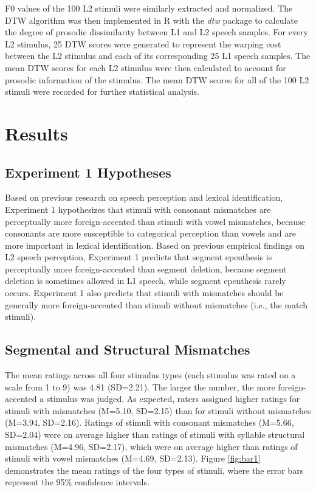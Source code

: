 F0 values of the 100 L2 stimuli were similarly extracted and normalized. The DTW algorithm was then implemented in R with the \textit{dtw} package \citep{Giorgino_2009} to calculate the degree of prosodic dissimilarity between L1 and L2 speech samples. For every L2 stimulus, 25 DTW scores were generated to represent the warping cost between the L2 stimulus and each of its corresponding 25 L1 speech samples. The mean DTW scores for each L2 stimulus were then calculated to account for prosodic information of the stimulus. The mean DTW scores for all of the 100 L2 stimuli were recorded for further statistical analysis. 

\section{Results}
\subsection{Experiment 1 Hypotheses}
Based on previous research on speech perception and lexical identification, Experiment 1 hypothesizes that stimuli with consonant mismatches are perceptually more foreign-accented than stimuli with vowel mismatches, because consonants are more susceptible to categorical perception than vowels and are more important in lexical identification. Based on previous empirical findings on L2 speech perception, Experiment 1 predicts that segment epenthesis is perceptually more foreign-accented than segment deletion, because segment deletion is sometimes allowed in L1 speech, while segment epenthesis rarely occurs. Experiment 1 also predicts that stimuli with mismatches should be generally more foreign-accented than stimuli without mismatches (i.e., the match stimuli).

\subsection{Segmental and Structural Mismatches}

The mean ratings across all four stimulus types (each stimulus was rated on a scale from 1 to 9) was 4.81 (SD=2.21). The larger the number, the more foreign-accented a stimulus was judged. As expected, raters assigned higher ratings for stimuli with mismatches (M=5.10, SD=2.15) than for stimuli without mismatches (M=3.94, SD=2.16). Ratings of stimuli with consonant mismatches (M=5.66, SD=2.04) were on average higher than ratings of stimuli with syllable structural mismatches (M=4.96, SD=2.17), which were on average higher than ratings of stimuli with vowel mismatches (M=4.69, SD=2.13). Figure \ref{fig:bar1} demonstrates the mean ratings of the four types of stimuli, where the error bars represent the 95\% confidence intervals. 

